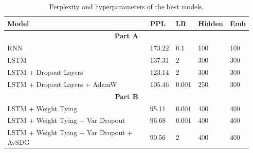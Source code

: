 \documentclass[a4paper]{article}
\begin{document}
\begin{table}[h!]
  \centering
  \begin{tabular}{l p{1 cm} p{1 cm} p{1 cm} p{1 cm}}
      \midrule
      \textbf{Model} & \textbf{PPL} & \textbf{LR} & \textbf{Hidden} & \textbf{Emb} \\
      \midrule
      \multicolumn{5}{c}{\textbf{Part A}} \\
      RNN                     & 173.22 & 0.1    & 100 & 100 \\
      LSTM                    & 137.31 & 2      & 300 & 300 \\
      LSTM + Dropout Layers      & 123.14 & 2      & 300 & 300 \\
      LSTM + Dropout Layers + AdamW & 105.46 & 0.001 & 250 & 300 \\
      \midrule
      \multicolumn{5}{c}{\textbf{Part B}} \\
      \midrule
      LSTM + Weight Tying & 95.11 & 0.001 & 400 & 400 \\
      LSTM + Weight Tying + Var Dropout & 96.68 & 0.001 & 400 & 400 \\
      LSTM + Weight Tying + Var Dropout + AvSDG & 90.56 & 2 & 400 & 400 \\

      \bottomrule
  \end{tabular}
  \caption{Perplexity and hyperparameters of the best models.}
  \label{tab:results}
\end{table}





\end{document}
